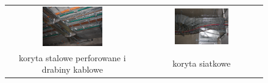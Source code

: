 \begin{figure}[ht!]
\begin{center}\begin{tabular}{cc}
\includegraphics[width=0.47\textwidth]{elektryka/Cabtray_11.jpg} & %
\includegraphics[width=0.47\textwidth]{elektryka/Cabtray_10.jpg} %
\\
koryta stalowe perforowane i drabiny kablowe &
koryta siatkowe
\end{tabular}\end{center}


\end{figure}
